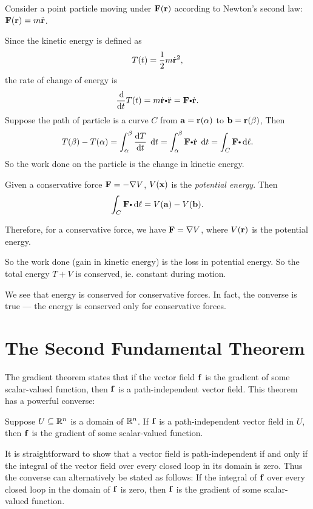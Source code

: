Consider a point particle moving under $\mathbf{ F}(\mathbf{ r})$ according to Newton's second law: $\mathbf{ F}(\mathbf{ r}) = m\ddot{\mathbf{ r}}$.

Since the kinetic energy is defined as
\[
  T(t) = \dfrac{1}{2}m\dot{\mathbf{ r}}^2,
\]
the rate of change of energy is
\[
  \dfrac{\d}{\d t}T(t) = m\dot{\vector{r}}\bp \ddot{\vector{r}} = \vector{F}\bp \dot{\vector{r}}.
\]
Suppose the path of particle is a curve $C$ from $\mathbf{ a} = \mathbf{ r}(\alpha)$ to $\mathbf{ b} = \mathbf{ r}(\beta)$, Then
\[
  T(\beta) - T(\alpha) = \dint_\alpha^\beta \dfrac{\d T}{\d t} \;\d t = \dint_\alpha^\beta \vector{F}\bp \dot{\vector{r}}\;\d t = \dint_C \vector{F}\bp \d \ell.
\]
So the work done on the particle is the change in kinetic energy.

\begin{df}
  Given a conservative force $\mathbf{ F} = -\nabla V$, $V(\mathbf{ x})$ is the \emph{potential energy}. Then
  \[
    \dint_C \vector{F}\bp \d \ell = V(\vector{a}) - V(\vector{b}).
  \]
\end{df}
Therefore, for a conservative force, we have $\mathbf{ F} = \nabla V$, where $V(\mathbf{ r})$ is the potential energy.

So the work done (gain in kinetic energy) is the loss in potential energy. So the total energy $T + V$ is conserved, ie. constant during motion.

We see that energy is conserved for conservative forces. In fact, the converse is true --- the energy is conserved only for conservative forces.

 \section{The Second  Fundamental Theorem}



The gradient theorem states that if the vector field $\mathbf{ f}$ is the gradient of some scalar-valued function, then $\mathbf{ f}$ is a path-independent vector field. This theorem has a powerful converse:

\begin{thm}
 Suppose $U \subseteq \mathbb{R}^n$ is a domain of $\mathbb{R}^n$.
If $\mathbf{ f}$ is a path-independent vector field in $U$, then $\mathbf{ f}$ is the gradient of some scalar-valued function.
\end{thm} 


It is straightforward to show that a vector field is path-independent if and only if the integral of the vector field over every closed loop in its domain is zero. Thus the converse can alternatively be stated as follows: If the integral of $\mathbf{ f}$ over every closed loop in the domain of $\mathbf{ f}$ is zero, then $\mathbf{ f}$ is the gradient of some scalar-valued function.

